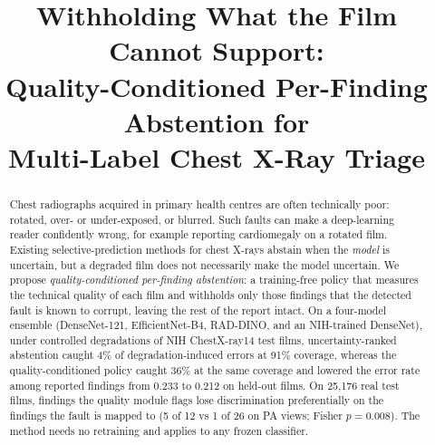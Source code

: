 \documentclass[conference]{IEEEtran}
\begin{document}
\title{Withholding What the Film Cannot Support:\\
Quality-Conditioned Per-Finding Abstention for\\
Multi-Label Chest X-Ray Triage}

\author{
\and
{}
}

\maketitle
\thispagestyle{empty}

\begin{abstract}
Chest radiographs acquired in primary health centres are often technically
poor: rotated, over- or under-exposed, or blurred. Such faults can make a
deep-learning reader confidently wrong, for example reporting cardiomegaly on a
rotated film. Existing selective-prediction methods for chest X-rays abstain
when the \emph{model} is uncertain, but a degraded film does not necessarily
make the model uncertain. We propose \emph{quality-conditioned per-finding
abstention}: a training-free policy that measures the technical quality of each
film and withholds only those findings that the detected fault is known to
corrupt, leaving the rest of the report intact. On a four-model ensemble
(DenseNet-121, EfficientNet-B4, RAD-DINO, and an NIH-trained DenseNet), under
controlled degradations of NIH ChestX-ray14 test films, uncertainty-ranked
abstention caught 4\% of degradation-induced errors at 91\% coverage, whereas
the quality-conditioned policy caught 36\% at the same coverage and lowered the
error rate among reported findings from 0.233 to 0.212 on held-out films. On
25{,}176 real test films, findings the quality module flags lose discrimination
preferentially on the findings the fault is mapped to (5 of 12 vs 1 of 26 on
PA views; Fisher $p=0.008$). The method needs no retraining and applies to any
frozen classifier.
\end{abstract}
\end{document}

